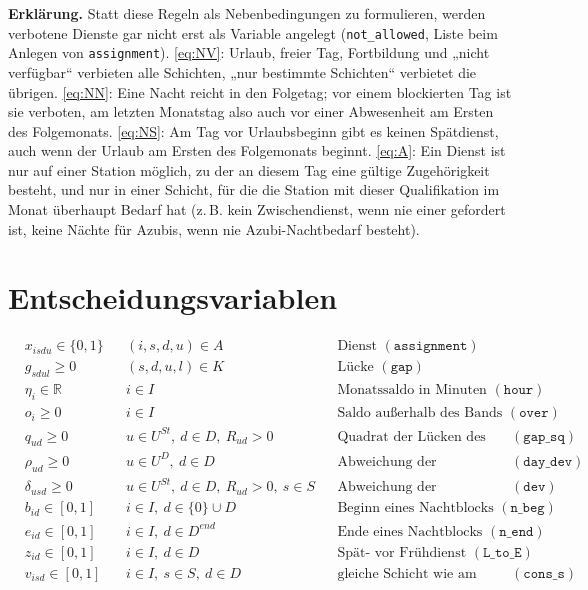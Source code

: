 \documentclass[11pt]{combiArticle}
\newcommand{\code}[1]{\texttt{#1}}
\begin{document}
\textbf{Erklärung.}
Statt diese Regeln als Nebenbedingungen zu formulieren, werden verbotene Dienste gar nicht erst als Variable
angelegt (\code{not\_allowed}, Liste beim Anlegen von \code{assignment}).
\eqref{eq:NV}: Urlaub, freier Tag, Fortbildung und „nicht verfügbar“ verbieten alle Schichten, „nur
bestimmte Schichten“ verbietet die übrigen.
\eqref{eq:NN}: Eine Nacht reicht in den Folgetag; vor einem blockierten Tag ist sie verboten, am letzten
Monatstag also auch vor einer Abwesenheit am Ersten des Folgemonats.
\eqref{eq:NS}: Am Tag vor Urlaubsbeginn gibt es keinen Spätdienst, auch wenn der Urlaub am Ersten des
Folgemonats beginnt.
\eqref{eq:A}: Ein Dienst ist nur auf einer Station möglich, zu der an diesem Tag eine gültige Zugehörigkeit
besteht, und nur in einer Schicht, für die die Station mit dieser Qualifikation im Monat überhaupt Bedarf hat
(z.\,B. kein Zwischendienst, wenn nie einer gefordert ist, keine Nächte für Azubis, wenn nie Azubi-Nachtbedarf
besteht).

\section{Entscheidungsvariablen}

\begin{align}
  & x_{isdu} \in \{0,1\} && (i,s,d,u) \in A && \text{Dienst } (\code{assignment}) \label{var:x}\\
  & g_{sdul} \ge 0 && (s,d,u,l) \in K && \text{Lücke } (\code{gap}) \label{var:g}\\
  & \eta_i \in \mathbb{R} && i \in I && \text{Monatssaldo in Minuten } (\code{hour}) \label{var:eta}\\
  & o_i \ge 0 && i \in I && \text{Saldo außerhalb des Bands } (\code{over}) \label{var:o}\\
  & q_{ud} \ge 0 && u \in U^{St},\ d \in D,\ R_{ud} > 0 && \text{Quadrat der Lücken des Tages } (\code{gap\_sq}) \label{var:q}\\
  & \rho_{ud} \ge 0 && u \in U^{D},\ d \in D && \text{Abweichung der Tagesbesetzung } (\code{day\_dev}) \label{var:rho}\\
  & \delta_{usd} \ge 0 && u \in U^{St},\ d \in D,\ R_{ud} > 0,\ s \in S && \text{Abweichung der Schichtbesetzung } (\code{dev}) \label{var:delta}\\
  & b_{id} \in [0,1] && i \in I,\ d \in \{0\} \cup D && \text{Beginn eines Nachtblocks } (\code{n\_beg}) \label{var:b}\\
  & e_{id} \in [0,1] && i \in I,\ d \in D^{end} && \text{Ende eines Nachtblocks } (\code{n\_end}) \label{var:e}\\
  & z_{id} \in [0,1] && i \in I,\ d \in D && \text{Spät- vor Frühdienst } (\code{L\_to\_E}) \label{var:z}\\
  & v_{isd} \in [0,1] && i \in I,\ s \in S,\ d \in D && \text{gleiche Schicht wie am Vortag } (\code{cons\_s}) \label{var:v}
\end{align}
\end{document}
